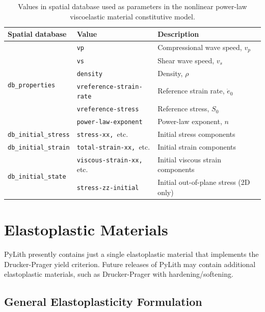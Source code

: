 \noindent \begin{center}
\begin{table}[H]
\noindent \centering{}\caption{\label{tab:powerLaw}Values in spatial database used as parameters
in the nonlinear power-law viscoelastic material constitutive model.}
\begin{tabular}{|l|l|l|}
\hline 
\textbf{Spatial database} & \textbf{Value} & \textbf{Description}\tabularnewline
\hline 
\hline 
\multirow{6}{*}{\texttt{db\_properties}} & \texttt{vp} & Compressional wave speed, $v_{p}$\tabularnewline
\cline{2-3} 
 & \texttt{vs} & Shear wave speed, $v_{s}$\tabularnewline
\cline{2-3} 
 & \texttt{density} & Density, $\rho$\tabularnewline
\cline{2-3} 
 & \texttt{vreference-strain-rate} & Reference strain rate, $\dot{e}_{0}$\tabularnewline
\cline{2-3} 
 & \texttt{vreference-stress} & Reference stress, $S_{0}$\tabularnewline
\cline{2-3} 
 & \texttt{power-law-exponent} & Power-law exponent, $n$\tabularnewline
\hline 
\texttt{db\_initial\_stress} & \texttt{stress-xx, }etc. & Initial stress components\tabularnewline
\hline 
\texttt{db\_initial\_strain} & \texttt{total-strain-xx, }etc. & Initial strain components\tabularnewline
\hline 
\multirow{2}{*}{\texttt{db\_initial\_state}} & \texttt{viscous-strain-xx, }etc. & Initial viscous strain components\tabularnewline
\cline{2-3} 
 & \texttt{stress-zz-initial} & Initial out-of-plane stress (2D only)\tabularnewline
\hline 
\end{tabular}
\end{table}

\par\end{center}


\section{Elastoplastic Materials}

PyLith presently contains just a single elastoplastic material that
implements the Drucker-Prager yield criterion. Future releases of
PyLith may contain additional elastoplastic materials, such as Drucker-Prager
with hardening/softening.


\subsection{General Elastoplasticity Formulation}

